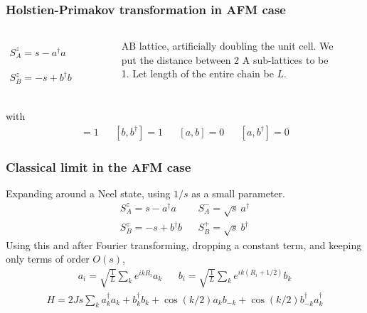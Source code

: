 \documentclass{beamer}
\begin{document}
\begin{frame}
    \frametitle{Holstien-Primakov transformation in AFM case}
    \begin{columns}
    \begin{column}{0.6\textwidth} 
        \begin{align*}
            S^z_A = s - a^\dagger a && S^-_A = a^\dagger \left[ s-\frac{a^\dagger a}{2} \right]^{1/2}   \nonumber \\ 
            S^z_B = -s + b^\dagger b && S^+_B = b^\dagger \left[s-\frac{b^\dagger b}{2}  \right]^{1/2}
        \end{align*}
    \end{column}
    \begin{column}{0.4\textwidth}
        \begin{figure}[h]
            \centering
            \caption{AB lattice, artificially doubling the unit cell. We put the distance between 2 A sub-lattices to be 1. Let length of the entire chain be $L$.}
            \label{AB_lattice}
        \end{figure}
    \end{column}
    \end{columns}
    with
    \begin{align*}
        [a,a^\dagger] = 1 && [b,b^\dagger] = 1 && [a,b] = 0 && [a,b^\dagger] =0
    \end{align*}
\end{frame}

\begin{frame}
    \frametitle{Classical limit in the AFM case}
    Expanding around a Neel state, using $1/s$ as a small parameter. 
    \begin{align*}
        S^z_A = s - a^\dagger a && S^-_A = \sqrt{s}\  a^\dagger   \nonumber \\ 
        S^z_B = -s + b^\dagger b && S^+_B = \sqrt{s}\  b^\dagger
    \end{align*}
    Using this and after Fourier transforming, dropping a constant term, and keeping only terms of order $O(s)$,
    \begin{align*}
        a_i = \sqrt{\frac{1}{L}} \sum_k e^{ik R_i} a_k && b_i = \sqrt{\frac{1}{L}} \sum_k e^{ik (R_i+1/2)} b_k 
    \end{align*}
    \begin{align*}
        H = 2Js \sum_k  a^\dagger_k a_k + b^\dagger_k b_k + \cos(k/2) a_k b_{-k} + \cos(k/2) b^\dagger_{-k} a^\dagger_k 
    \end{align*}


\end{frame}
\end{document}
